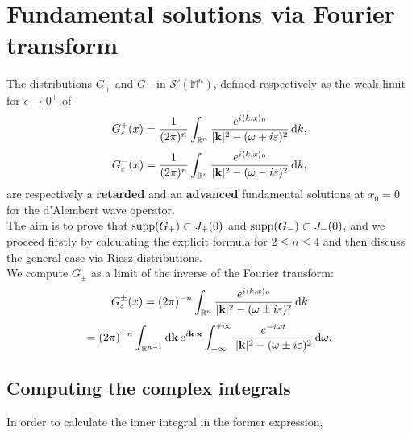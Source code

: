 \section{Fundamental solutions via Fourier transform}
\label{sec:fundafourier}
	The distributions $G_+$ and $G_-$ in $\mathcal{S}'(\mathbb{M}^n)$, defined respectively as the weak limit for $\epsilon\to 0^+$ of
	\begin{equation}
	G_\varepsilon^+(x)=\frac{1}{(2\pi)^n}\int_{{\mathbb R}^n}\frac{e^{i\langle k,x\rangle_0}}{|\mathbf{k}|^2-(\omega+ i\varepsilon)^2}\,\mathrm d k,
	\label{eq:retardedfourier}
	\end{equation}
	\begin{equation}
	G_\varepsilon^-(x)=\frac{1}{(2\pi)^n}\int_{{\mathbb R}^n}\frac{e^{i\langle k,x\rangle_0}}{|\mathbf{k}|^2-(\omega- i\varepsilon)^2}\,\mathrm d k,
	\label{eq:advancedfourier}
	\end{equation}	
are respectively a \textbf{retarded} and an \textbf{advanced} fundamental solutions at $x_0=0$ for the d'Alembert wave operator.\\
The aim is to prove that $\text{supp}(G_+)	\subset J_+(0)$ and $\text{supp}(G_-)	\subset J_-(0)$, and we proceed firstly by calculating the explicit formula for $2\leq n\leq 4$ and then discuss the general case via Riesz distributions.\\




\noindent We compute $G_\pm$ as a limit of the inverse of the Fourier transform:
\[		G_\varepsilon^{\pm}(x)=(2\pi)^{-n}\int_{{\mathbb R}^n}\frac{e^{i\langle k,x\rangle_0}}{|\mathbf{k}|^2-(\omega\pm i\varepsilon)^2}\,\mathrm d k\]
\begin{equation}=(2\pi)^{-n}	\int_{{\mathbb R}^{n-1}}\mathrm d\mathbf{k}\,e^{i\mathbf{k}\cdot\mathbf{x}}\int_{-\infty}^{+\infty}\frac{e^{-i\omega t}}{|\mathbf{k}|^2-(\omega\pm i\varepsilon)^2}\,\mathrm d\omega. \label{eq:fourierinverse}	\end{equation}


\subsection*{Computing the complex integrals}
In order to calculate the inner integral in the former expression,

